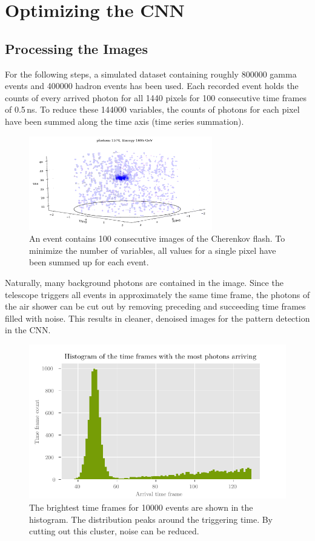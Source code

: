 \chapter{Optimizing the CNN}%

\section{Processing the Images}
For the following steps, a simulated dataset containing roughly \num{800000} gamma events
and \num{400000} hadron events has been used.
Each recorded event holds the counts of every arrived photon for all \num{1440} pixels
for \num{100} consecutive time frames of \num{0.5}\,\si{\nano\second}.
To reduce these \num{144000} variables,
the counts of photons for each pixel have been summed along the time axis (time series summation).

\begin{figure}
    \centering
    \includegraphics[width=8cm]{Plots/Photon_Event_3D.png}
    \caption{An event contains \num{100} consecutive images of the Cherenkov flash. To minimize the number of variables, all values for a single pixel have been summed up for each event.}
    \label{fig:example_event}
\end{figure}

Naturally, many background photons are contained in the image.
Since the telescope triggers all events in approximately the same time frame,
the photons of the air shower can be cut out by removing preceding and succeeding time frames filled with noise.
This results in cleaner, denoised images for the pattern detection in the CNN.

\begin{figure}
    \centering
    \includegraphics[scale=1]{Plots/Arrivaltimes.pdf}
    \caption{The brightest time frames for \num{10000} events are shown in the histogram. The distribution peaks around the triggering time. By cutting out this cluster, noise can be reduced.}
    \label{fig:arrivaltimes}
\end{figure}

